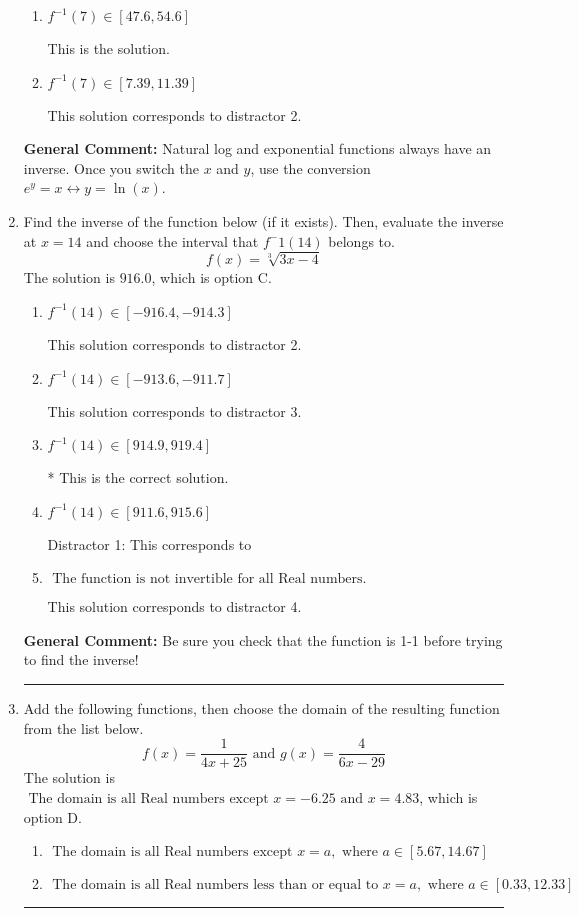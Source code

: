 \documentclass{extbook}[14pt]
\newcommand{\litem}[1]{\item #1

\rule{\textwidth}{0.4pt}}
\begin{document}
\begin{enumerate}
{\begin{enumerate}[label=\Alph*.]
 This solution corresponds to distractor 1.
\item \( f^{-1}(7) \in [47.6, 54.6] \)

 This is the solution.
\item \( f^{-1}(7) \in [7.39, 11.39] \)

 This solution corresponds to distractor 2.
\end{enumerate}

\textbf{General Comment:} Natural log and exponential functions always have an inverse. Once you switch the $x$ and $y$, use the conversion $ e^y = x \leftrightarrow y=\ln(x)$.
}
\litem{
Find the inverse of the function below (if it exists). Then, evaluate the inverse at $x = 14$ and choose the interval that $f^-1(14)$ belongs to.
\[ f(x) = \sqrt[3]{3 x - 4} \]The solution is \( 916.0 \), which is option C.\begin{enumerate}[label=\Alph*.]
\item \( f^{-1}(14) \in [-916.4, -914.3] \)

 This solution corresponds to distractor 2.
\item \( f^{-1}(14) \in [-913.6, -911.7] \)

 This solution corresponds to distractor 3.
\item \( f^{-1}(14) \in [914.9, 919.4] \)

* This is the correct solution.
\item \( f^{-1}(14) \in [911.6, 915.6] \)

 Distractor 1: This corresponds to 
\item \( \text{ The function is not invertible for all Real numbers. } \)

 This solution corresponds to distractor 4.
\end{enumerate}

\textbf{General Comment:} Be sure you check that the function is 1-1 before trying to find the inverse!
}
\litem{
Add the following functions, then choose the domain of the resulting function from the list below.
\[ f(x) = \frac{1}{4x+25} \text{ and } g(x) = \frac{4}{6x-29} \]The solution is \( \text{ The domain is all Real numbers except } x = -6.25 \text{ and } x = 4.83 \), which is option D.\begin{enumerate}[label=\Alph*.]
\item \( \text{ The domain is all Real numbers except } x = a, \text{ where } a \in [5.67, 14.67] \)


\item \( \text{ The domain is all Real numbers less than or equal to } x = a, \text{ where } a \in [0.33, 12.33] \)



\end{enumerate}}
\end{enumerate}
\end{document}
